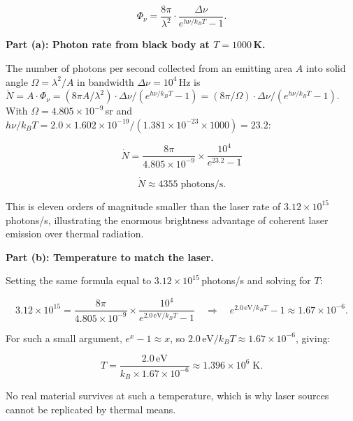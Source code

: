 \begin{equation*}
  \boxed{\Phi_\nu = \frac{8\pi}{\lambda^{2}}\cdot\frac{\Delta\nu}{e^{h\nu/k_BT}-1}.}
\end{equation*}

\textbf{Part (a): Photon rate from black body at $T = 1000$\,K.}

The number of photons per second collected from an emitting area $A$ into solid angle $\Omega = \lambda^{2}/A$ in bandwidth $\Delta\nu = 10^{4}$\,Hz is $\dot{N} = A\cdot\Phi_\nu = (8\pi A/\lambda^{2})\cdot\Delta\nu/(e^{h\nu/k_BT}-1) = (8\pi/\Omega)\cdot\Delta\nu/(e^{h\nu/k_BT}-1)$. With $\Omega = 4.805\times10^{-9}$\,sr and $h\nu/k_BT = 2.0\times1.602\times10^{-19}/(1.381\times10^{-23}\times1000) = 23.2$:

\begin{equation*}
  \dot{N} = \frac{8\pi}{4.805\times10^{-9}}\times\frac{10^{4}}{e^{23.2}-1}
\end{equation*}

\begin{equation*}
  \boxed{\dot{N} \approx 4355\;\text{photons/s.}}
\end{equation*}

This is eleven orders of magnitude smaller than the laser rate of $3.12\times10^{15}$\,photons/s, illustrating the enormous brightness advantage of coherent laser emission over thermal radiation.

\textbf{Part (b): Temperature to match the laser.}

Setting the same formula equal to $3.12\times10^{15}$\,photons/s and solving for $T$:

\begin{equation*}
  3.12\times10^{15} = \frac{8\pi}{4.805\times10^{-9}}\times\frac{10^{4}}{e^{2.0\,\text{eV}/k_BT}-1}
  \quad\Longrightarrow\quad
  e^{2.0\,\text{eV}/k_BT} - 1 \approx 1.67\times10^{-6}.
\end{equation*}

For such a small argument, $e^x - 1 \approx x$, so $2.0\,\text{eV}/k_BT \approx 1.67\times10^{-6}$, giving:

\begin{equation*}
  \boxed{T = \frac{2.0\,\text{eV}}{k_B\times1.67\times10^{-6}} \approx 1.396\times10^{6}\;\text{K.}}
\end{equation*}

No real material survives at such a temperature, which is why laser sources cannot be replicated by thermal means.


